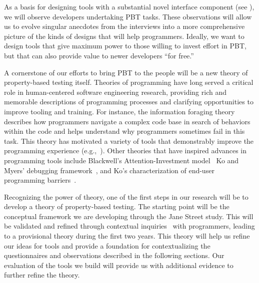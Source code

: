 As a basis for designing tools with a substantial novel interface component (see
), we will observe developers undertaking PBT tasks. These
observations will allow us to evolve singular anecdotes from the interviews into
a more comprehensive picture of the kinds of designs that will help programmers.
Ideally, we want to design tools that give maximum power to those willing to
invest effort in PBT, but that can also provide value to newer developers ``for
free.'' 

%
A cornerstone of our efforts to bring PBT to the people
will be a new theory of property-based testing itself.  Theories of
programming have
long served a critical role in human-centered software engineering
research, providing rich and memorable descriptions of programming
processes and clarifying opportunities to improve tooling and training.
For instance, the information foraging theory~\cite{ref:lawrance2010programmers}
describes how programmers navigate a complex code base in search of behaviors
within the code and helps understand why programmers sometimes fail
in this task. This
theory has motivated a variety of tools that demonstrably improve the
programming experience (e.g.,~\cite{ref:henley2014patchworks}).  Other theories
that have inspired advances in programming tools include
Blackwell's Attention-Investment model~\cite{ref:blackwell2002first} Ko and
Myers' debugging framework~\cite{ref:ko2005framework}, and Ko's characterization
of end-user programming barriers~\cite{ref:ko2004six}.

Recognizing the power of theory, one of the first steps in our
research will be to develop a theory of property-based
testing. The starting point
will be the conceptual framework we are developing through the Jane Street study. This
will be validated and refined through contextual inquiries~\cite[Ch.
3]{ref:holtzblatt1997contextual} with programmers, leading to a provisional
theory during the first two years.  This theory will help us
refine our ideas for
tools and provide a foundation for contextualizing the questionnaires and
observations described in the following sections. Our evaluation of
the tools we build will provide us with additional evidence to further
refine the theory.


